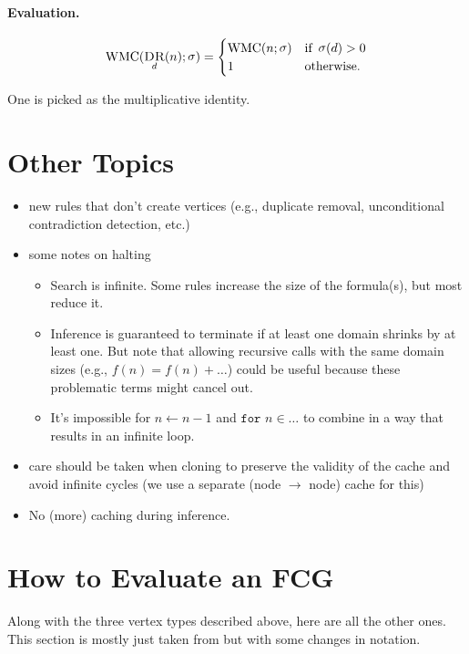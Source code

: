 \documentclass{article}
\theoremstyle{definition}
\theoremstyle{remark}
\DeclareMathOperator{\DR}{\textsc{DR}}
\DeclareMathOperator{\size}{\sigma}
\DeclareMathOperator{\WMC}{WMC}
\begin{document}
\paragraph{Evaluation.}
\[
\WMC(\DR_d(n); \size) =
\begin{cases}
  \WMC(n; \size) & \text{if } \size(d) > 0 \\
  1 & \text{otherwise.}
\end{cases}
\]

One is picked as the multiplicative identity.

\section{Other Topics}

\begin{itemize}
\item new rules that don't create vertices (e.g., duplicate removal, unconditional contradiction detection, etc.)
\item some notes on halting
  \begin{itemize}
  \item Search is infinite. Some rules increase the size of the formula(s), but most reduce it.
  \item Inference is guaranteed to terminate if at least one domain shrinks by at least one. But note that allowing recursive calls with the same domain sizes (e.g., $f(n) = f(n) + \dots$) could be useful because these problematic terms might cancel out.
  \item It's impossible for $n \gets n - 1$ and $\texttt{for } n \in \dots$ to combine in a way that results in an infinite loop.
  \end{itemize}
\item care should be taken when cloning to preserve the validity of the cache and avoid infinite cycles (we use a separate (node $\to$ node) cache for this)
\item No (more) caching during inference.
\end{itemize}

\section{How to Evaluate an FCG} \label{sec:evaluation}

Along with the three vertex types described above, here are all the other ones. This section is mostly just taken from \cite{DBLP:conf/ijcai/BroeckTMDR11} but with some changes in notation.
\end{document}
